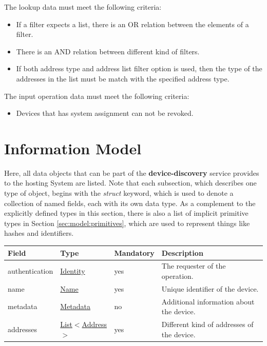 \documentclass[a4paper]{arrowhead}
\newcommand{\pref}[1]{{\textcolor{ArrowheadGrey}{\hyperref[sec:model:primitives:#1]{#1}}}}
\begin{document}

The lookup data must meet the following criteria:

\begin{itemize}
    \item If a filter expects a list, there is an OR relation between the elements of a filter.
    \item There is an AND relation between different kind of filters.
    \item If both address type and address list filter option is used, then the type of the addresses in the list must be match with the specified address type.
\end{itemize}


The input operation data must meet the following criteria:

\begin{itemize}
    \item Devices that has system assignment can not be revoked.
\end{itemize}


\clearpage

\section{Information Model}
\label{sec:model}

Here, all data objects that can be part of the \textbf{device-discovery} service
provides to the hosting System are listed.
Note that each subsection, which describes one type of object, begins with the \textit{struct} keyword, which is used to denote a collection of named fields, each with its own data type.
As a complement to the explicitly defined types in this section, there is also a list of implicit primitive types in Section \ref{sec:model:primitives}, which are used to represent things like hashes and identifiers.

 
\begin{table}[ht!]
\begin{tabularx}{\textwidth}{| p{3cm} | p{3cm} | p{2cm} | X |} \hline
\rowcolor{gray!33} Field & Type & Mandatory & Description \\ \hline
authentication & \hyperref[sec:model:Identity]{Identity} & yes & The requester of the operation. \\ \hline
name & \pref{Name} & yes & Unique identifier of the device. \\ \hline
metadata &\hyperref[sec:model:Metadata]{Metadata} & no & Additional information about the device. \\ \hline
addresses &  \pref{List}$<$\pref{Address}$>$ & yes & Different kind of addresses of the device.  \\ \hline
\end{tabularx}
\end{table}
\end{document}
